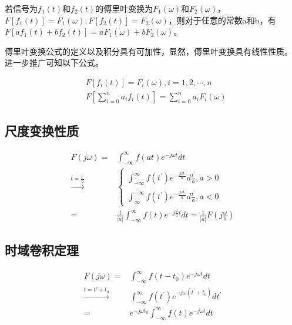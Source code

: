 \documentclass[journal]{IEEEtran}
\begin{document}
若信号为$f_1(t)$和$f_2(t)$的傅里叶变换为$F_1(\omega)$和$F_2(\omega)$，$F[f_1(t)] = F_1(\omega), F[f_2(t)] = F_2(\omega)$，则对于任意的常数a和b，有$F[af_1(t) + bf_2(t)] = aF_1(\omega) + bF_2(\omega)$。

傅里叶变换公式的定义以及积分具有可加性，显然，傅里叶变换具有线性性质。
进一步推广可知以下公式。

\begin{equation}
	\begin{split}
		& F[f_i(t)] = F_i(\omega), i = 1, 2, \cdots, n {} \\
		& F[\sum_{i = 0}^{n}a_if_i(t)] = \sum_{i = 0}^{n}a_iF_i(\omega)
	\end{split}
\end{equation}

\subsection{尺度变换性质}

\begin{equation}
	\begin{split}
	F(j \omega)=&\int_{-\infty}^{\infty} f(a t) e^{-j \omega t} d t \\ \stackrel{t=\frac{t^{\prime}}{a}}{\longrightarrow}&\left\{\begin{array}{l}{\int_{-\infty}^{\infty} f\left(t^{\prime}\right) e^{-\frac{j \omega t^{\prime}}{a}} d \frac{t^{\prime}}{a}, a>0} \\ {\int_{\infty}^{-\infty} f\left(t^{\prime}\right) e^{-\frac{j \omega t^{\prime}}{a}} d \frac{t^{\prime}}{a}, a<0}\end{array}\right. \\
	=&\frac{1}{|a|} \int_{-\infty}^{\infty} f(t) e^{-j \frac{\omega}{a} t} d t=\frac{1}{|a|} F\left(j \frac{\omega}{a}\right)
	\end{split}	
\end{equation}

\subsection{时域卷积定理}

\begin{equation}
	\begin{split}
	F(j \omega)=&\int_{-\infty}^{\infty} f\left(t-t_{0}\right) e^{-j \omega t} dt {} \\ \stackrel{t=t' + t_0}{\longrightarrow} &\int_{-\infty}^{\infty} f\left(t^{\prime}\right) e^{-j \omega\left(t^{\prime}+t_{0}\right)} d t^{\prime} {} \\ =&e^{-j \omega t_{0}} \int_{-\infty}^{\infty} f(t) e^{-j \omega t} dt
	\end{split}	
\end{equation}
\end{document}

